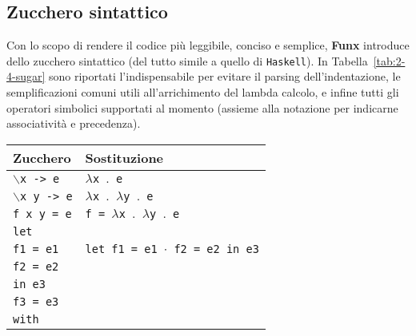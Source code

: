 \subsection{Zucchero sintattico}
\label{sec:2-4-syntactic-sugar}

Con lo scopo di rendere il codice più leggibile, conciso e semplice, \textbf{Funx} introduce
dello zucchero sintattico (del tutto simile a quello di \texttt{Haskell}).
In Tabella~\ref{tab:2-4-sugar} sono riportati l'indispensabile per evitare il parsing dell'indentazione,
le semplificazioni comuni utili all'arrichimento del lambda calcolo, e infine tutti gli operatori simbolici
supportati al momento (assieme alla notazione per indicarne associatività e precedenza).

\newpage

\begin{table}[H]
    \begin{center}
        \begin{tabularx}{\textwidth}{|P{15em}|X|}
            \hline
            \textbf{Zucchero}                & \textbf{Sostituzione}                                            \\
            \hline
            \texttt{$\backslash$x -> e}      & \texttt{$\lambda$x $\mathord{.}$ e}                              \\
            \hline
            \texttt{$\backslash$x y -> e}    & \texttt{$\lambda$x $\mathord{.}$ $\lambda$y $\mathord{.}$ e}     \\
            \hline
            \texttt{f x y = e}               & \texttt{f = $\lambda$x $\mathord{.}$ $\lambda$y $\mathord{.}$ e} \\
            \hline
            \texttt{let}                     &                                                                  \\
            \texttt{f1 = e1}                 & \texttt{let f1 = e1 $\cdot$ f2 = e2 in e3}                       \\
            \texttt{f2 = e2}                 &                                                                  \\
            \texttt{in e3}                   &                                                                  \\
            \hline
            \texttt{f3 = e3}                 &                                                                  \\
            \texttt{with}                    &                                                                  \\

\end{tabularx}
\end{center}
\end{table}
